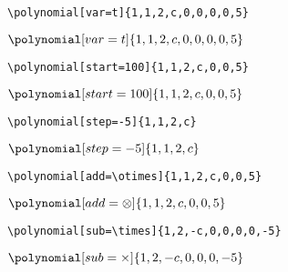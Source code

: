 \begin{center}
\begin{minipage}[l]{.59\textwidth}
\begin{verbatim}
\polynomial[var=t]{1,1,2,c,0,0,0,0,5}
\end{verbatim}
\end{minipage}
\begin{minipage}[r]{.39\textwidth}
\qquad$\polynomial[var=t]{1,1,2,c,0,0,0,0,5}$
\end{minipage}\vspace{.5cm}

\begin{minipage}[l]{.59\textwidth}
\begin{verbatim}
\polynomial[start=100]{1,1,2,c,0,0,5}
\end{verbatim}
\end{minipage}
\begin{minipage}[r]{.39\textwidth}
$\polynomial[start=100]{1,1,2,c,0,0,5}$
\end{minipage}\vspace{.5cm}

\begin{minipage}[l]{.59\textwidth}
\begin{verbatim}
\polynomial[step=-5]{1,1,2,c}
\end{verbatim}
\end{minipage}
\begin{minipage}[r]{.39\textwidth}
\qquad $\polynomial[step=-5]{1,1,2,c}$
\end{minipage}\vspace{.5cm}

\begin{minipage}[l]{.59\textwidth}
\begin{verbatim}\polynomial[add=\otimes]{1,1,2,c,0,0,5}
\end{verbatim}
\end{minipage}
\begin{minipage}[r]{.39\textwidth}
\qquad $\polynomial[add=\otimes]{1,1,2,c,0,0,5}$
\end{minipage}\vspace{.5cm}

\begin{minipage}[l]{.59\textwidth}
\begin{verbatim}\polynomial[sub=\times]{1,2,-c,0,0,0,0,-5}
\end{verbatim}
\end{minipage}
\begin{minipage}[r]{.39\textwidth}
\qquad\quad $\polynomial[sub=\times]{1,2,-c,0,0,0,-5}$
\end{minipage}
\end{center}





